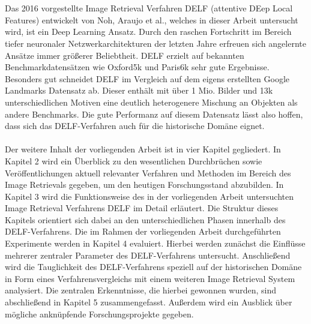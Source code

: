 \\\\
Das 2016 vorgestellte Image Retrieval Verfahren DELF (attentive DEep Local Features) \cite{delf} entwickelt von Noh, \mbox{Araujo} et al., welches in dieser Arbeit untersucht wird, ist ein Deep Learning Ansatz. Durch den raschen Fortschritt im Bereich tiefer neuronaler Netzwerkarchitekturen der letzten Jahre erfreuen sich angelernte Ansätze immer größerer Beliebtheit. DELF erzielt auf bekannten Benchmarkdatensätzen wie Oxford5k \cite{oxford5k} und Paris6k \cite{paris6k} sehr gute Ergebnisse. Besonders gut schneidet DELF im Vergleich auf dem eigens erstellten Google Landmarks Datensatz \cite{landmarks} ab. Dieser enthält mit über 1 Mio. Bilder und 13k unterschiedlichen Motiven eine deutlich heterogenere Mischung an Objekten als andere Benchmarks. Die gute Performanz auf diesem Datensatz lässt also hoffen, dass sich das DELF-Verfahren auch für die historische Domäne eignet.
\\\\
Der weitere Inhalt der vorliegenden Arbeit ist in vier Kapitel gegliedert. In Kapitel 2 wird ein Überblick zu den wesentlichen Durchbrüchen sowie Veröffentlichungen aktuell relevanter Verfahren und Methoden im Bereich des Image Retrievals gegeben, um den heutigen Forschungsstand abzubilden. In Kapitel 3 wird die Funktionsweise des in der vorliegenden Arbeit untersuchten Image Retrieval Verfahrens DELF im Detail erläutert. Die Struktur dieses Kapitels orientiert sich dabei an den unterschiedlichen Phasen innerhalb des DELF-Verfahrens. Die im Rahmen der vorliegenden Arbeit durchgeführten Experimente werden in Kapitel 4 evaluiert. Hierbei werden zunächst die Einflüsse mehrerer zentraler Parameter des DELF-Verfahrens untersucht. Anschließend wird die Tauglichkeit des DELF-Verfahrens speziell auf der historischen Domäne in Form eines Verfahrensvergleichs mit einem weiteren Image Retrieval System analysiert. Die zentralen Erkenntnisse, die hierbei gewonnen wurden, sind abschließend in Kapitel 5 zusammengefasst. Außerdem wird ein Ausblick über mögliche anknüpfende Forschungsprojekte gegeben.
